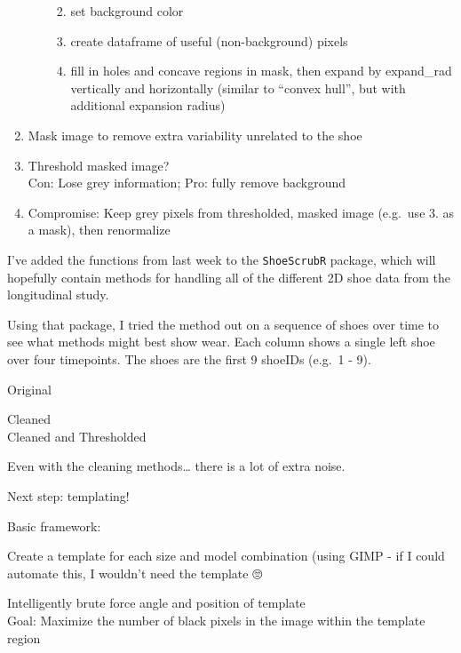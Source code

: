 \documentclass[]{book}
\providecommand{\tightlist}{%
  \setlength{\itemsep}{0pt}\setlength{\parskip}{0pt}}
\begin{document}
\begin{enumerate}
\begin{enumerate}
    \begin{enumerate}
    \def\labelenumiii{\arabic{enumiii}.}
    \tightlist
    \item
      set background color
    \item
      create dataframe of useful (non-background) pixels
    \item
      fill in holes and concave regions in mask, then expand by expand\_rad vertically and horizontally (similar to ``convex hull'', but with additional expansion radius)
    \end{enumerate}
  \end{enumerate}
\item
  Mask image to remove extra variability unrelated to the shoe\\
\item
  Threshold masked image?\\
  Con: Lose grey information; Pro: fully remove background\\
\item
  Compromise: Keep grey pixels from thresholded, masked image (e.g.~use 3. as a mask), then renormalize\\
\end{enumerate}

I've added the functions from last week to the \texttt{ShoeScrubR} package, which will hopefully contain methods for handling all of the different 2D shoe data from the longitudinal study.

Using that package, I tried the method out on a sequence of shoes over time to see what methods might best show wear. Each column shows a single left shoe over four timepoints. The shoes are the first 9 shoeIDs (e.g.~1 - 9).

Original

Cleaned\\

Cleaned and Thresholded

Even with the cleaning methods\ldots{} there is a lot of extra noise.

Next step: templating!

Basic framework:

Create a template for each size and model combination
(using GIMP - if I could automate this, I wouldn't need the template 🙄

Intelligently brute force angle and position of template\\
Goal: Maximize the number of black pixels in the image within the template region
\end{document}
